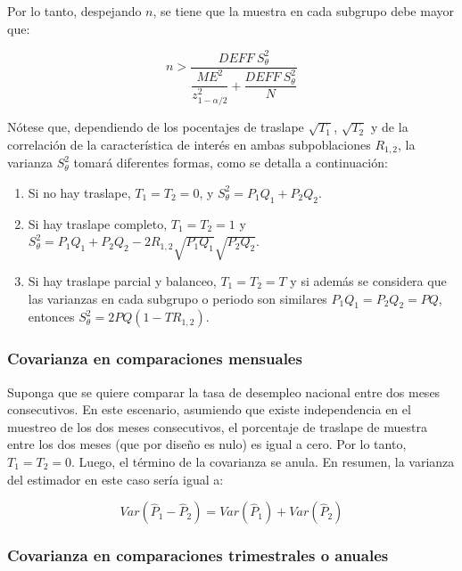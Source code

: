 \documentclass[
  12pt,
]{book}
\providecommand{\tightlist}{%
  \setlength{\itemsep}{0pt}\setlength{\parskip}{0pt}}
\begin{document}
Por lo tanto, despejando \(n\), se tiene que la muestra en cada subgrupo debe mayor que:

\[
 n> \dfrac{DEFF \ S^2_{\theta}}{\dfrac{ME^2}{z_{1-\alpha/2}^2}+\dfrac{DEFF \ S^2_{\theta}}{N}}
\]

Nótese que, dependiendo de los pocentajes de traslape \(\sqrt{T_1}\), \(\sqrt{T_2}\) y de la correlación de la característica de interés en ambas subpoblaciones \(R_{1,2}\), la varianza \(S^2_{\theta}\) tomará diferentes formas, como se detalla a continuación:

\begin{enumerate}
\def\labelenumi{\arabic{enumi}.}
\tightlist
\item
  Si no hay traslape, \(T_1 = T_2 = 0\), y \(S^2_{\theta} = P_1Q_1+P_2Q_2\).
\item
  Si hay traslape completo, \(T_1 = T_2 = 1\) y \(S^2_{\theta} = P_1Q_1+P_2Q_2 - 2 R_{1,2} \sqrt{P_1Q_1}\sqrt{P_2Q_2}\).
\item
  Si hay traslape parcial y balanceo, \(T_1 = T_2 = T\) y si además se considera que las varianzas en cada subgrupo o periodo son similares \(P_1Q_1 = P_2Q_2 = PQ\), entonces \(S^2_{\theta} = 2PQ (1- TR_{1,2})\).
\end{enumerate}

\hypertarget{covarianza-en-comparaciones-mensuales}{%
\subsubsection{Covarianza en comparaciones mensuales}\label{covarianza-en-comparaciones-mensuales}}

Suponga que se quiere comparar la tasa de desempleo nacional entre dos meses consecutivos. En este escenario, asumiendo que existe independencia en el muestreo de los dos meses consecutivos, el porcentaje de traslape de muestra entre los dos meses (que por diseño es nulo) es igual a cero. Por lo tanto, \(T_1 = T_2 = 0\). Luego, el término de la covarianza se anula. En resumen, la varianza del estimador en este caso sería igual a:

\[
Var(\hat{P}_1-\hat{P}_2) 
= Var(\hat{P}_1) + Var(\hat{P}_2)
\]

\hypertarget{covarianza-en-comparaciones-trimestrales-o-anuales}{%
\subsubsection{Covarianza en comparaciones trimestrales o anuales}\label{covarianza-en-comparaciones-trimestrales-o-anuales}}
\end{document}

